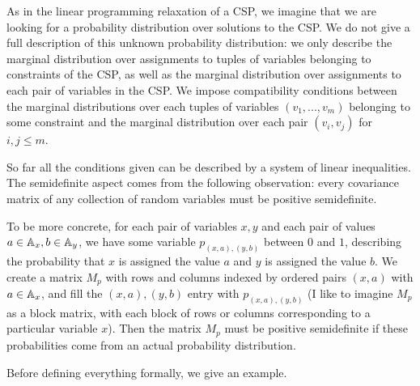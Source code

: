 \documentclass[letterpaper,11pt]{article}
\begin{document}
As in the linear programming relaxation of a CSP, we imagine that we are looking for a probability distribution over solutions to the CSP. We do not give a full description of this unknown probability distribution: we only describe the marginal distribution over assignments to tuples of variables belonging to constraints of the CSP, as well as the marginal distribution over assignments to each pair of variables in the CSP. We impose compatibility conditions between the marginal distributions over each tuples of variables $(v_1, ..., v_m)$ belonging to some constraint and the marginal distribution over each pair $(v_i,v_j)$ for $i,j \le m$.

So far all the conditions given can be described by a system of linear inequalities. The semidefinite aspect comes from the following observation: every covariance matrix of any collection of random variables must be positive semidefinite.

To be more concrete, for each pair of variables $x,y$ and each pair of values $a \in \mathbb{A}_x, b \in \mathbb{A}_y$, we have some variable $p_{(x,a),(y,b)}$ between $0$ and $1$, describing the probability that $x$ is assigned the value $a$ and $y$ is assigned the value $b$. We create a matrix $M_p$ with rows and columns indexed by ordered pairs $(x,a)$ with $a \in \mathbb{A}_x$, and fill the $(x,a),(y,b)$ entry with $p_{(x,a),(y,b)}$ (I like to imagine $M_p$ as a block matrix, with each block of rows or columns corresponding to a particular variable $x$). Then the matrix $M_p$ must be positive semidefinite if these probabilities come from an actual probability distribution.

Before defining everything formally, we give an example.
\end{document}
